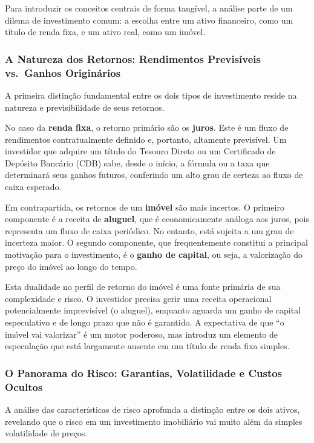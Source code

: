\documentclass[
  a4paper,
]{book}
\begin{document}
Para introduzir os conceitos centrais de forma tangível, a análise parte
de um dilema de investimento comum: a escolha entre um ativo financeiro,
como um título de renda fixa, e um ativo real, como um imóvel.

\subsubsection{A Natureza dos Retornos: Rendimentos Previsíveis
vs.~Ganhos
Originários}\label{a-natureza-dos-retornos-rendimentos-previsuxedveis-vs.-ganhos-originuxe1rios}

A primeira distinção fundamental entre os dois tipos de investimento
reside na natureza e previsibilidade de seus retornos.

No caso da \textbf{renda fixa}, o retorno primário são os
\textbf{juros}. Este é um fluxo de rendimentos contratualmente definido
e, portanto, altamente previsível. Um investidor que adquire um título
do Tesouro Direto ou um Certificado de Depósito Bancário (CDB) sabe,
desde o início, a fórmula ou a taxa que determinará seus ganhos futuros,
conferindo um alto grau de certeza ao fluxo de caixa esperado.

Em contrapartida, os retornos de um \textbf{imóvel} são mais incertos. O
primeiro componente é a receita de \textbf{aluguel}, que é
economicamente análoga aos juros, pois representa um fluxo de caixa
periódico. No entanto, está sujeita a um grau de incerteza maior. O
segundo componente, que frequentemente constitui a principal motivação
para o investimento, é o \textbf{ganho de capital}, ou seja, a
valorização do preço do imóvel ao longo do tempo.

Esta dualidade no perfil de retorno do imóvel é uma fonte primária de
sua complexidade e risco. O investidor precisa gerir uma receita
operacional potencialmente imprevisível (o aluguel), enquanto aguarda um
ganho de capital especulativo e de longo prazo que não é garantido. A
expectativa de que ``o imóvel vai valorizar'' é um motor poderoso, mas
introduz um elemento de especulação que está largamente ausente em um
título de renda fixa simples.

\subsubsection{O Panorama do Risco: Garantias, Volatilidade e Custos
Ocultos}\label{o-panorama-do-risco-garantias-volatilidade-e-custos-ocultos}

A análise das características de risco aprofunda a distinção entre os
dois ativos, revelando que o risco em um investimento imobiliário vai
muito além da simples volatilidade de preços.
\end{document}
